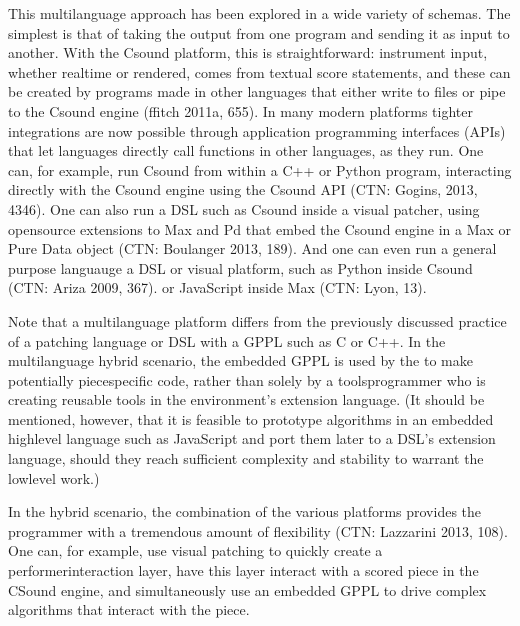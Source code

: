 \documentclass[letterpaper,10pt,english]{sphinxmanual}
\begin{document}
\sphinxAtStartPar
This multi\sphinxhyphen{}language approach has been explored in a wide variety of schemas.
The simplest is that of taking the output from one program
and sending it as input to another. With the Csound platform, this
is straightforward: instrument input, whether real\sphinxhyphen{}time or rendered,
comes from textual score statements, and these can be created by programs
made in other languages that either write to files or pipe to the Csound engine (ffitch 2011a, 655).
In many modern platforms tighter integrations are now possible
through application programming interfaces (APIs) that let languages directly call
functions in other languages, as they run.
One can, for example, run Csound from within a C++ or Python program, interacting
directly with the Csound engine using the Csound API (CTN: Gogins, 2013, 43\sphinxhyphen{}46).
One can also run a DSL such as Csound inside a visual patcher, using open\sphinxhyphen{}source
extensions to Max and Pd that embed the Csound engine in a Max or Pure Data object (CTN: Boulanger 2013, 189).
And one can even run a general purpose languauge  a DSL or visual platform,
such as Python inside Csound (CTN: Ariza 2009, 367).
or JavaScript inside Max (CTN: Lyon, 13).

\sphinxAtStartPar
Note that a multi\sphinxhyphen{}language platform differs from the previously discussed practice of
 a patching language or DSL with a GPPL such as C or C++.
In the multi\sphinxhyphen{}language hybrid scenario, the embedded GPPL is used
by the  to make potentially piece\sphinxhyphen{}specific code,
rather than solely by a tools\sphinxhyphen{}programmer who is creating reusable tools in the environment’s extension language.
(It should be mentioned, however, that it is feasible to prototype algorithms in an embedded high\sphinxhyphen{}level language such as
JavaScript and port them later to a DSL’s extension language,
should they reach sufficient complexity and stability to warrant the low\sphinxhyphen{}level work.)

\sphinxAtStartPar
In the hybrid scenario, the combination of the various platforms
provides the programmer with a tremendous amount of flexibility (CTN: Lazzarini 2013, 108).
One can, for example, use visual patching to quickly
create a performer\sphinxhyphen{}interaction layer, have this layer interact with
a scored piece in the CSound engine, and simultaneously use an embedded GPPL to
drive complex algorithms that interact with the piece.
\end{document}
